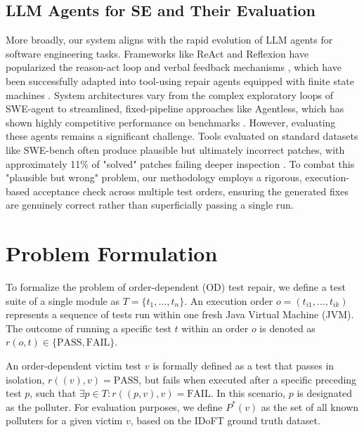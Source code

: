 \documentclass[conference]{IEEEtran}
\begin{document}
\subsection{LLM Agents for SE and Their Evaluation}
More broadly, our system aligns with the rapid evolution of LLM agents for software engineering tasks. Frameworks like ReAct and Reflexion have popularized the reason-act loop and verbal feedback mechanisms \cite{yao2023react, shinn2023reflexion}, which have been successfully adapted into tool-using repair agents equipped with finite state machines \cite{bouzenia2025repairagent}. System architectures vary from the complex exploratory loops of SWE-agent \cite{yang2024sweagent} to streamlined, fixed-pipeline approaches like Agentless, which has shown highly competitive performance on benchmarks \cite{xia2025agentless}. However, evaluating these agents remains a significant challenge. Tools evaluated on standard datasets like SWE-bench \cite{jimenez2024swebench} often produce plausible but ultimately incorrect patches, with approximately 11\% of "solved" patches failing deeper inspection \cite{wang2026swebench}. To combat this "plausible but wrong" problem, our methodology employs a rigorous, execution-based acceptance check across multiple test orders, ensuring the generated fixes are genuinely correct rather than superficially passing a single run.

\section{Problem Formulation}
\label{sec:problem}
To formalize the problem of order-dependent (OD) test repair, we define a test suite of a single module as $T = \{t_1, \dots, t_n\}$. An execution order $o = (t_{i1}, \dots, t_{ik})$ represents a sequence of tests run within one fresh Java Virtual Machine (JVM). The outcome of running a specific test $t$ within an order $o$ is denoted as $r(o, t) \in \{\text{PASS}, \text{FAIL}\}$.

An order-dependent victim test $v$ is formally defined as a test that passes in isolation, $r((v), v) = \text{PASS}$, but fails when executed after a specific preceding test $p$, such that $\exists p \in T: r((p, v), v) = \text{FAIL}$. In this scenario, $p$ is designated as the polluter. For evaluation purposes, we define $P^*(v)$ as the set of all known polluters for a given victim $v$, based on the IDoFT ground truth dataset.
\end{document}
